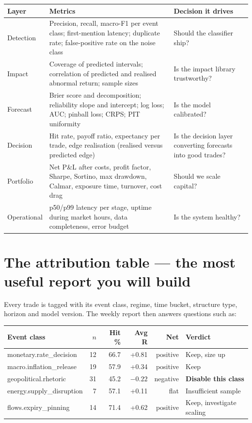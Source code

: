 \begin{longtable}{@{}p{2.6cm}p{4.2cm}p{7.8cm}@{}}
\toprule
\textbf{Layer} & \textbf{Metrics} & \textbf{Decision it drives}\\
\midrule
Detection & Precision, recall, macro-F1 per event class; first-mention latency;
duplicate rate; false-positive rate on the noise class & Should the classifier
ship?\\
Impact & Coverage of predicted intervals; correlation of predicted and realised
abnormal return; sample sizes & Is the impact library trustworthy?\\
Forecast & Brier score and decomposition; reliability slope and intercept;
log loss; AUC; pinball loss; CRPS; PIT uniformity & Is the model calibrated?\\
Decision & Hit rate, payoff ratio, expectancy per trade, edge realisation
(realised versus predicted edge) & Is the decision layer converting forecasts
into good trades?\\
Portfolio & Net P\&L after costs, profit factor, Sharpe, Sortino, max drawdown,
Calmar, exposure time, turnover, cost drag & Should we scale capital?\\
Operational & p50/p99 latency per stage, uptime during market hours, data
completeness, error budget & Is the system healthy?\\
\bottomrule
\end{longtable}

\section{The attribution table --- the most useful report you will build}

Every trade is tagged with its event class, regime, time bucket, structure type,
horizon and model version. The weekly report then answers questions such as:

\begin{longtable}{@{}p{4.4cm}rrrrp{3.2cm}@{}}
\toprule
\textbf{Event class} & \textbf{$n$} & \textbf{Hit \%} & \textbf{Avg R} &
\textbf{Net} & \textbf{Verdict}\\
\midrule
monetary.rate\_decision & 12 & 66.7 & +0.81 & positive & Keep, size up\\
macro.inflation\_release & 19 & 57.9 & +0.34 & positive & Keep\\
geopolitical.rhetoric & 31 & 45.2 & $-0.22$ & negative & \textbf{Disable this
class}\\
energy.supply\-\_disruption & 7 & 57.1 & +0.11 & flat & Insufficient sample\\
flows.expiry\_pinning & 14 & 71.4 & +0.62 & positive & Keep, investigate scaling\\
\bottomrule
\end{longtable}

